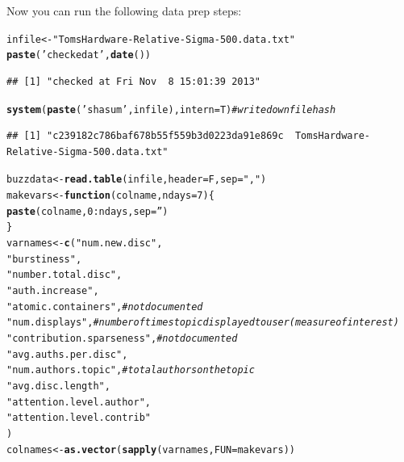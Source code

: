 \documentclass{article}\usepackage[]{graphicx}\usepackage[]{color}
\makeatletter
\newcommand{\hlnum}[1]{\textcolor[rgb]{0.686,0.059,0.569}{#1}}%
\newcommand{\hlstr}[1]{\textcolor[rgb]{0.192,0.494,0.8}{#1}}%
\newcommand{\hlcom}[1]{\textcolor[rgb]{0.678,0.584,0.686}{\textit{#1}}}%
\newcommand{\hlopt}[1]{\textcolor[rgb]{0,0,0}{#1}}%
\newcommand{\hlstd}[1]{\textcolor[rgb]{0.345,0.345,0.345}{#1}}%
\newcommand{\hlkwa}[1]{\textcolor[rgb]{0.161,0.373,0.58}{\textbf{#1}}}%
\newcommand{\hlkwb}[1]{\textcolor[rgb]{0.69,0.353,0.396}{#1}}%
\newcommand{\hlkwc}[1]{\textcolor[rgb]{0.333,0.667,0.333}{#1}}%
\newcommand{\hlkwd}[1]{\textcolor[rgb]{0.737,0.353,0.396}{\textbf{#1}}}%
\newenvironment{kframe}{%
 \def\at@end@of@kframe{}%
 \ifinner\ifhmode%
  \def\at@end@of@kframe{\end{minipage}}%
  \begin{minipage}{\columnwidth}%
 \fi\fi%
 \def\FrameCommand##1{\hskip\@totalleftmargin \hskip-\fboxsep
 \colorbox{shadecolor}{##1}\hskip-\fboxsep
     \hskip-\linewidth \hskip-\@totalleftmargin \hskip\columnwidth}%
 \MakeFramed {\advance\hsize-\width
   \@totalleftmargin\z@ \linewidth\hsize
   \@setminipage}}%
 {\par\unskip\endMakeFramed%
 \at@end@of@kframe}
\newenvironment{knitrout}{}{} %
\makeatother
\begin{document}



Now you can run the following data prep steps:

\begin{knitrout}
\color{fgcolor}\begin{kframe}
\begin{alltt}
\hlstd{infile} \hlkwb{<-} \hlstr{"TomsHardware-Relative-Sigma-500.data.txt"}
\hlkwd{paste}\hlstd{(}\hlstr{'checked at'}\hlstd{,}\hlkwd{date}\hlstd{())}
\end{alltt}
\begin{verbatim}
## [1] "checked at Fri Nov  8 15:01:39 2013"
\end{verbatim}
\begin{alltt}
\hlkwd{system}\hlstd{(}\hlkwd{paste}\hlstd{(}\hlstr{'shasum'}\hlstd{,infile),}\hlkwc{intern}\hlstd{=T)}  \hlcom{# write down file hash}
\end{alltt}
\begin{verbatim}
## [1] "c239182c786baf678b55f559b3d0223da91e869c  TomsHardware-Relative-Sigma-500.data.txt"
\end{verbatim}
\begin{alltt}
\hlstd{buzzdata} \hlkwb{<-} \hlkwd{read.table}\hlstd{(infile,} \hlkwc{header}\hlstd{=F,} \hlkwc{sep}\hlstd{=}\hlstr{","}\hlstd{)}
\hlstd{makevars} \hlkwb{<-} \hlkwa{function}\hlstd{(}\hlkwc{colname}\hlstd{,} \hlkwc{ndays}\hlstd{=}\hlnum{7}\hlstd{) \{}
  \hlkwd{paste}\hlstd{(colname,} \hlnum{0}\hlopt{:}\hlstd{ndays,} \hlkwc{sep}\hlstd{=}\hlstr{''}\hlstd{)}
\hlstd{\}}
\hlstd{varnames} \hlkwb{<-} \hlkwd{c}\hlstd{(}\hlstr{"num.new.disc"}\hlstd{,}
             \hlstr{"burstiness"}\hlstd{,}
             \hlstr{"number.total.disc"}\hlstd{,}
             \hlstr{"auth.increase"}\hlstd{,}
             \hlstr{"atomic.containers"}\hlstd{,} \hlcom{# not documented}
             \hlstr{"num.displays"}\hlstd{,} \hlcom{# number of times topic displayed to user (measure of interest)}
             \hlstr{"contribution.sparseness"}\hlstd{,} \hlcom{# not documented}
             \hlstr{"avg.auths.per.disc"}\hlstd{,}
             \hlstr{"num.authors.topic"}\hlstd{,} \hlcom{# total authors on the topic}
             \hlstr{"avg.disc.length"}\hlstd{,}
             \hlstr{"attention.level.author"}\hlstd{,}
             \hlstr{"attention.level.contrib"}
\hlstd{)}
\hlstd{colnames} \hlkwb{<-} \hlkwd{as.vector}\hlstd{(}\hlkwd{sapply}\hlstd{(varnames,} \hlkwc{FUN}\hlstd{=makevars))}

\end{alltt}
\end{kframe}
\end{knitrout}
\end{document}
